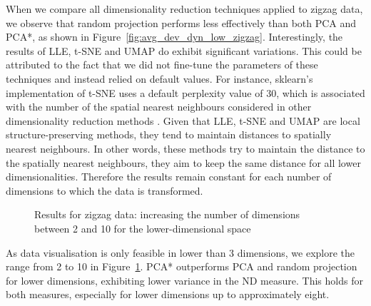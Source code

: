 \documentclass[pdftex,12pt,a4paper]{report}
\begin{document}
When we compare all dimensionality reduction techniques applied to zigzag data, we observe that random projection performs less effectively than both PCA and PCA*, as shown in Figure~\ref{fig:avg_dev_dyn_low_zigzag}.
Interestingly, the results of LLE, t-SNE and UMAP do exhibit significant variations.
This could be attributed to the fact that we did not fine-tune the parameters of these techniques and instead relied on default values.
For instance, sklearn's implementation of t-SNE uses a default perplexity value of 30, which is associated with the number of the spatial nearest neighbours considered in other dimensionality reduction methods \cite{website-tsne}.
Given that LLE, t-SNE and UMAP are local structure-preserving methods, they tend to maintain distances to spatially nearest neighbours.
In other words, these methods try to maintain the distance to the spatially nearest neighbours, they aim to keep the same distance for all lower dimensionalities.
Therefore the results remain constant for each number of dimensions to which the data is transformed.

\begin{figure}[!htb]
    \caption{Results for zigzag data: increasing the number of dimensions between 2 and 10 for the lower-dimensional space}\label{fig:avg_dev_dyn_low_zigzag_zoom}
\end{figure}
As data visualisation is only feasible in lower than 3 dimensions, we explore the range from 2 to 10 in Figure~\ref{fig:avg_dev_dyn_low_zigzag_zoom}.
PCA* outperforms PCA and random projection for lower dimensions, exhibiting lower variance in the ND measure.
This holds for both measures, especially for lower dimensions up to approximately eight.
\end{document}
